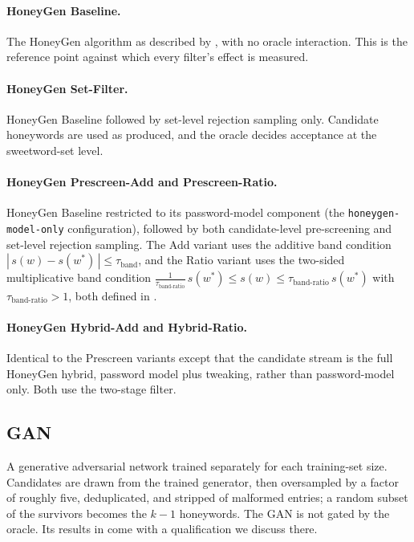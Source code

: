 \paragraph{HoneyGen Baseline.}
The HoneyGen algorithm as described by
\textcite{dionysiou2021honeygen}, with no oracle interaction. This is
the reference point against which every filter's effect is measured.

\paragraph{HoneyGen Set-Filter.}
HoneyGen Baseline followed by set-level rejection sampling only.
Candidate honeywords are used as produced, and the oracle decides
acceptance at the sweetword-set level.

\paragraph{HoneyGen Prescreen-Add and Prescreen-Ratio.}
HoneyGen Baseline restricted to its password-model component (the
\texttt{honeygen-model-only} configuration), followed by both
candidate-level pre-screening and set-level rejection sampling. The Add
variant uses the additive band condition
$|\, s(w) - s(w^{*}) \,| \le \tau_{\text{band}}$, and the Ratio variant
uses the two-sided multiplicative band condition
$\tfrac{1}{\tau_{\text{band-ratio}}}\, s(w^{*}) \le s(w) \le
\tau_{\text{band-ratio}}\, s(w^{*})$ with $\tau_{\text{band-ratio}} > 1$,
both defined in .

\paragraph{HoneyGen Hybrid-Add and Hybrid-Ratio.}
Identical to the Prescreen variants except that the candidate stream is
the full HoneyGen hybrid, password model plus tweaking, rather than
password-model only. Both use the two-stage filter.

\subsection{GAN}

A generative adversarial network trained separately for each
training-set size. Candidates are drawn from the trained generator, then
oversampled by a factor of roughly five, deduplicated, and stripped of
malformed entries; a random subset of the survivors becomes the $k-1$
honeywords. The GAN is not gated by the oracle. Its results in
 come with a qualification we discuss there.


